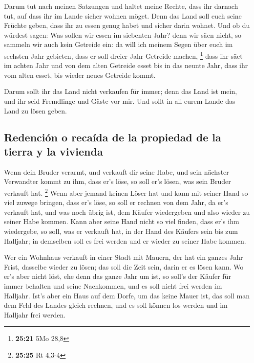  Darum tut nach meinen Satzungen und haltet meine Rechte,
dass ihr darnach tut, auf dass ihr im Lande sicher wohnen möget.
 Denn das Land soll euch seine Früchte geben, dass ihr zu
essen genug habet und sicher darin wohnet.  Und ob du
würdest sagen: Was sollen wir essen im siebenten Jahr? denn wir säen
nicht, so sammeln wir auch kein Getreide ein:  da will
ich meinem Segen über euch im sechsten Jahr gebieten, dass er soll
dreier Jahr Getreide machen, \footnote{\textbf{25:21} 5Mo 28,8}
 dass ihr säet im achten Jahr und von dem alten Getreide
esset bis in das neunte Jahr, dass ihr vom alten esset, bis wieder neues
Getreide kommt.

 Darum sollt ihr das Land nicht verkaufen für immer; denn
das Land ist mein, und ihr seid Fremdlinge und Gäste vor mir.
 Und sollt in all eurem Lande das Land zu lösen geben.

\hypertarget{redenciuxf3n-o-recauxedda-de-la-propiedad-de-la-tierra-y-la-vivienda}{%
\subsection{Redención o recaída de la propiedad de la tierra y la
vivienda}\label{redenciuxf3n-o-recauxedda-de-la-propiedad-de-la-tierra-y-la-vivienda}}

 Wenn dein Bruder verarmt, und verkauft dir seine Habe,
und sein nächster Verwandter kommt zu ihm, dass er's löse, so soll er's
lösen, was sein Bruder verkauft hat. \footnote{\textbf{25:25} Rt 4,3-4}
 Wenn aber jemand keinen Löser hat und kann mit seiner
Hand so viel zuwege bringen, dass er's löse,  so soll er
rechnen von dem Jahr, da er's verkauft hat, und was noch übrig ist, dem
Käufer wiedergeben und also wieder zu seiner Habe kommen.
 Kann aber seine Hand nicht so viel finden, dass er's ihm
wiedergebe, so soll, was er verkauft hat, in der Hand des Käufers sein
bis zum Halljahr; in demselben soll es frei werden und er wieder zu
seiner Habe kommen.

 Wer ein Wohnhaus verkauft in einer Stadt mit Mauern, der
hat ein ganzes Jahr Frist, dasselbe wieder zu lösen; das soll die Zeit
sein, darin er es lösen kann.  Wo er's aber nicht löst,
ehe denn das ganze Jahr um ist, so soll's der Käufer für immer behalten
und seine Nachkommen, und es soll nicht frei werden im Halljahr.
 Ist's aber ein Haus auf dem Dorfe, um das keine Mauer
ist, das soll man dem Feld des Landes gleich rechnen, und es soll können
los werden und im Halljahr frei werden.

